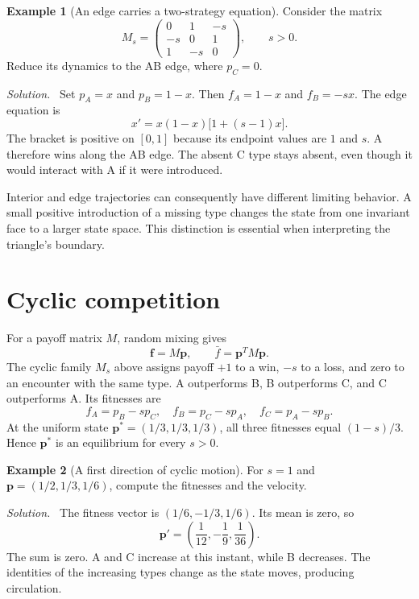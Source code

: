 \documentclass[11pt,oneside,openany]{book}
\theoremstyle{definition}
\newtheorem{example}{Example}[chapter]
\theoremstyle{remark}
\newenvironment{solution}{\par\smallskip\noindent\textit{Solution.}\ }{\par\smallskip}
\newcommand{\p}{\mathbf{p}}
\newcommand{\f}{\mathbf{f}}
\numberwithin{equation}{chapter}
\begin{document}
\begin{example}[An edge carries a two-strategy equation]
Consider the matrix
\[
M_s=\begin{pmatrix}0&1&-s\\-s&0&1\\1&-s&0\end{pmatrix},\qquad s>0.
\]
Reduce its dynamics to the AB edge, where $p_C=0$.
\begin{solution}
Set $p_A=x$ and $p_B=1-x$. Then $f_A=1-x$ and $f_B=-sx$. The edge equation is
\[
x'=x(1-x)\bigl[1+(s-1)x\bigr].
\]
The bracket is positive on $[0,1]$ because its endpoint values are $1$ and $s$. A therefore wins along the AB edge. The absent C type stays absent, even though it would interact with A if it were introduced.
\end{solution}
\end{example}

Interior and edge trajectories can consequently have different limiting behavior. A small positive introduction of a missing type changes the state from one invariant face to a larger state space. This distinction is essential when interpreting the triangle's boundary.

\section{Cyclic competition}
For a payoff matrix $M$, random mixing gives
\[
\f=M\p,\qquad \bar f=\p^TM\p.
\]
The cyclic family $M_s$ above assigns payoff $+1$ to a win, $-s$ to a loss, and zero to an encounter with the same type. A outperforms B, B outperforms C, and C outperforms A. Its fitnesses are
\begin{equation}\label{eq:cyclicfitness}
f_A=p_B-sp_C,\quad f_B=p_C-sp_A,\quad f_C=p_A-sp_B.
\end{equation}
At the uniform state $\p^*=(1/3,1/3,1/3)$, all three fitnesses equal $(1-s)/3$. Hence $\p^*$ is an equilibrium for every $s>0$.

\begin{example}[A first direction of cyclic motion]
For $s=1$ and $\p=(1/2,1/3,1/6)$, compute the fitnesses and the velocity.
\begin{solution}
The fitness vector is $(1/6,-1/3,1/6)$. Its mean is zero, so
\[
\p'=\left(\frac1{12},-\frac19,\frac1{36}\right).
\]
The sum is zero. A and C increase at this instant, while B decreases. The identities of the increasing types change as the state moves, producing circulation.
\end{solution}
\end{example}
\end{document}
